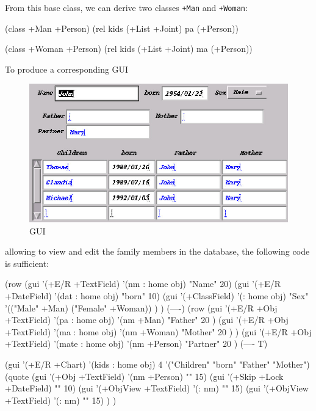 From this base class, we can derive two classes \texttt{+Man} and \texttt{+Woman}:


\begin{wideverbatim}
(class +Man +Person)
(rel kids (+List +Joint) pa (+Person))

(class +Woman +Person)
(rel kids (+List +Joint) ma (+Person))
\end{wideverbatim}

To produce a corresponding GUI


\begin{figure}[H]
  \centering
  \includegraphics[scale=.5]{graphics/xmplGui.jpg}
  \caption{GUI}
  \label{fig:family-gui}
\end{figure}


allowing to view and edit the family members in the database, the
following code is sufficient:


\begin{wideverbatim}
(row
   (gui '(+E/R +TextField) '(nm : home obj) "Name" 20)
   (gui '(+E/R +DateField) '(dat : home obj) "born" 10)
   (gui '(+ClassField)
      '(: home obj) "Sex"
      '(("Male" +Man) ("Female" +Woman)) ) )
(----)
(row
   (gui '(+E/R +Obj +TextField)
      '(pa : home obj) '(nm +Man)
      "Father" 20 )
   (gui '(+E/R +Obj +TextField)
      '(ma : home obj) '(nm +Woman)
      "Mother" 20 ) )
(gui '(+E/R +Obj +TextField)
   '(mate : home obj) '(nm +Person)
   "Partner" 20 )
(---- T)

\end{wideverbatim}

\begin{wideverbatim}

(gui '(+E/R +Chart)
   '(kids : home obj)
   4 '("Children" "born" "Father" "Mother")
   (quote
      (gui '(+Obj +TextField) '(nm +Person) "" 15)
      (gui '(+Skip +Lock +DateField) "" 10)
      (gui '(+ObjView +TextField) '(: nm) "" 15)
      (gui '(+ObjView +TextField) '(: nm) "" 15) ) )
\end{wideverbatim}

